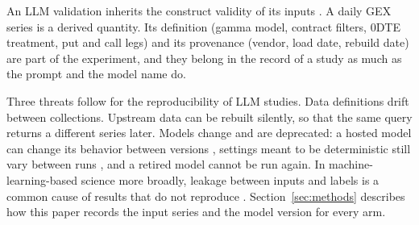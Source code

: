 An LLM validation inherits the construct validity of its inputs \cite{cronbach1955construct}. A daily GEX series is a derived quantity. Its definition (gamma model, contract filters, 0DTE treatment, put and call legs) and its provenance (vendor, load date, rebuild date) are part of the experiment, and they belong in the record of a study as much as the prompt and the model name do.

Three threats follow for the reproducibility of LLM studies. Data definitions drift between collections. Upstream data can be rebuilt silently, so that the same query returns a different series later. Models change and are deprecated: a hosted model can change its behavior between versions \cite{chen2024chatgpt}, settings meant to be deterministic still vary between runs \cite{atil2025nondeterminism}, and a retired model cannot be run again. In machine-learning-based science more broadly, leakage between inputs and labels is a common cause of results that do not reproduce \cite{kapoor2023leakage}. Section~\ref{sec:methods} describes how this paper records the input series and the model version for every arm.
